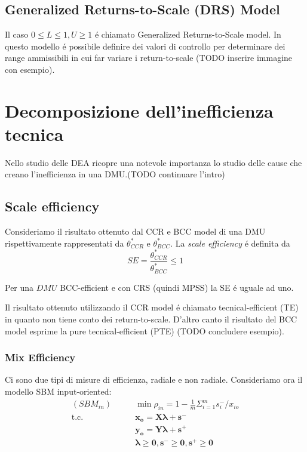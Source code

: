 \subsection{Generalized Returns-to-Scale (DRS) Model}
\bigskip
Il caso $0 \leq L \leq 1, U \geq 1$ \'e chiamato Generalized Returns-to-Scale model. In questo modello \'e possibile definire dei valori di controllo per determinare dei range ammissibili in cui far variare i return-to-scale (TODO inserire immagine con esempio).
\section{Decomposizione dell'inefficienza tecnica}
\bigskip

Nello studio delle DEA ricopre una notevole importanza lo studio delle cause che creano l'inefficienza in una DMU.(TODO continuare l'intro)

\subsection{Scale efficiency}

\begin{definiz} \label{EQ:scale efficiency}
Consideriamo il risultato ottenuto dal CCR e BCC model di una DMU rispettivamente rappresentati da $\theta^*_{CCR}$ e $\theta^*_{BCC}$. La \emph{scale efficiency} \'e definita da
\begin{equation}
SE = \frac{\theta^*_{CCR}}{\theta^*_{BCC}} \leq 1
\end{equation}
\end{definiz}
\begin{oss} Per una $DMU$ BCC-efficient e con CRS (quindi MPSS) la SE \'e uguale ad uno. 
\end{oss}
\begin{oss} Il risultato ottenuto utilizzando il CCR model \'e chiamato tecnical-efficient (TE) in quanto non tiene conto dei return-to-scale. D'altro canto il risultato del BCC model esprime la pure tecnical-efficient (PTE) (TODO concludere esempio).
\end{oss}

\subsubsection{Mix Efficiency}
\bigskip
Ci sono due tipi di misure di efficienza, radiale e non radiale. Consideriamo ora il modello SBM input-oriented:
\begin{equation}
\begin{split}
(SBM_{in}) \qquad & \min \rho_{in} = 1 - \frac{1}{m} \Sigma^m_{i=1} s^-_i / x_{io} \\
\text{t.c.} \qquad & \boldsymbol{x_o = X\lambda + s^-} \\
& \boldsymbol{y_o = Y\lambda + s^+} \\
& \boldsymbol{\lambda \geq 0, s^- \geq 0, s^+ \geq 0}\\
\end{split}
\end{equation}


